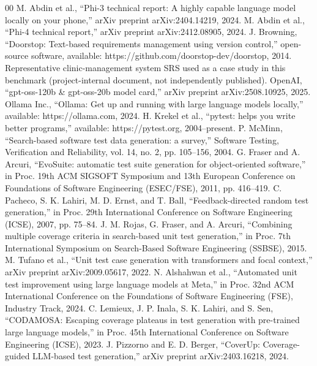 \documentclass[conference]{IEEEtran}
\begin{document}
\begin{thebibliography}{00}
 M. Abdin et al., ``Phi-3 technical report: A highly capable language model locally on your phone,'' arXiv preprint arXiv:2404.14219, 2024.
 M. Abdin et al., ``Phi-4 technical report,'' arXiv preprint arXiv:2412.08905, 2024.
 J. Browning, ``Doorstop: Text-based requirements management using version control,'' open-source software, available: https://github.com/doorstop-dev/doorstop, 2014.
 Representative clinic-management system SRS used as a case study in this benchmark (project-internal document, not independently published).
 OpenAI, ``gpt-oss-120b \& gpt-oss-20b model card,'' arXiv preprint arXiv:2508.10925, 2025.
 Ollama Inc., ``Ollama: Get up and running with large language models locally,'' available: https://ollama.com, 2024.
 H. Krekel et al., ``pytest: helps you write better programs,'' available: https://pytest.org, 2004--present.
 P. McMinn, ``Search-based software test data generation: a survey,'' Software Testing, Verification and Reliability, vol. 14, no. 2, pp. 105--156, 2004.
 G. Fraser and A. Arcuri, ``EvoSuite: automatic test suite generation for object-oriented software,'' in Proc. 19th ACM SIGSOFT Symposium and 13th European Conference on Foundations of Software Engineering (ESEC/FSE), 2011, pp. 416--419.
 C. Pacheco, S. K. Lahiri, M. D. Ernst, and T. Ball, ``Feedback-directed random test generation,'' in Proc. 29th International Conference on Software Engineering (ICSE), 2007, pp. 75--84.
 J. M. Rojas, G. Fraser, and A. Arcuri, ``Combining multiple coverage criteria in search-based unit test generation,'' in Proc. 7th International Symposium on Search-Based Software Engineering (SSBSE), 2015.
 M. Tufano et al., ``Unit test case generation with transformers and focal context,'' arXiv preprint arXiv:2009.05617, 2022.
 N. Alshahwan et al., ``Automated unit test improvement using large language models at Meta,'' in Proc. 32nd ACM International Conference on the Foundations of Software Engineering (FSE), Industry Track, 2024.
 C. Lemieux, J. P. Inala, S. K. Lahiri, and S. Sen, ``CODAMOSA: Escaping coverage plateaus in test generation with pre-trained large language models,'' in Proc. 45th International Conference on Software Engineering (ICSE), 2023.
 J. Pizzorno and E. D. Berger, ``CoverUp: Coverage-guided LLM-based test generation,'' arXiv preprint arXiv:2403.16218, 2024.

\end{thebibliography}
\end{document}
